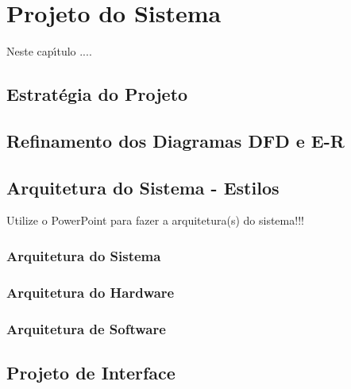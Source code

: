 
\chapter{Projeto do Sistema}

Neste cap\'{\i}tulo ....


\section{Estrat\'{e}gia do Projeto}


\section{Refinamento dos Diagramas DFD e E-R}


\section{Arquitetura do Sistema - Estilos}

    Utilize o PowerPoint para fazer a arquitetura(s) do sistema!!!

    \subsection{Arquitetura do Sistema}



    \subsection{Arquitetura do Hardware}


    \subsection{Arquitetura de Software}


\section{Projeto de Interface}


